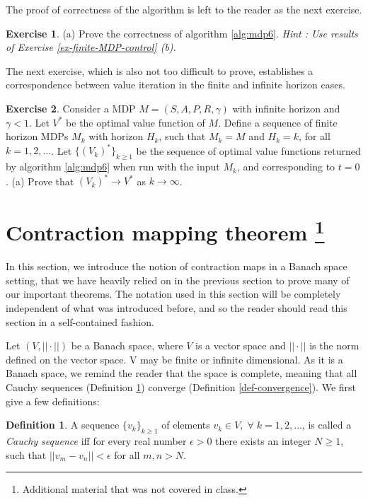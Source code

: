 \documentclass{article}
\theoremstyle{definition}
\newtheorem{exercise}{Exercise}[section]
\newtheorem{definition}{Definition}[section]
\theoremstyle{remark}
\begin{document}
The proof of correctness of the algorithm is left to the reader as the next exercise.
\begin{exercise}
(a) Prove the correctness of algorithm \ref{alg:mdp6}. \textit{Hint : Use results of Exercise \ref{ex-finite-MDP-control} (b).}
\label{ex-finite-value-iteration-convergence}
\end{exercise}

The next exercise, which is also not too difficult to prove, establishes a correspondence between value iteration in the finite and infinite horizon cases.

\begin{exercise}
Consider a MDP $M=(S,A,P,R,\gamma)$ with infinite horizon and $\gamma < 1$. Let $V^{\ast}$ be the optimal value function of $M$. Define a sequence of finite horizon MDPs  $M_k$ with horizon $H_k$, such that $M_k = M$ and $H_k = k$, for all $k=1,2,\dots$. Let $\{(V_k)^{\ast}\}_{k \geq 1}$ be the sequence of optimal value functions returned by algorithm \ref{alg:mdp6} when run with the input $M_k$, and corresponding to $t = 0$. (a) Prove that $(V_k)^{\ast} \rightarrow V^{\ast}$ as $k \rightarrow \infty$.
\label{ex-value-iteration-finite-infinite-correspondence}
\end{exercise}


\clearpage
\appendix
\appendixpage
\section{Contraction mapping theorem \footnote{Additional material that was not covered in class.} }
\label{contraction-map}
In this section, we introduce the notion of contraction maps in a Banach space setting, that we have heavily relied on in the previous section to prove many of our important theorems. The notation used in this section will be completely independent of what was introduced before, and so the reader should read this section in a self-contained fashion.

Let $(V,||\cdot||)$ be a Banach space, where $V$ is a vector space and $||\cdot||$ is the norm defined on the vector space. V may be finite or infinite dimensional. As it is a Banach space, we remind the reader that the space is complete, meaning that all Cauchy sequences (Definition \ref{def-cauchy-seq}) converge (Definition \ref{def-convergence}). We first give a few definitions:

\begin{definition}
A sequence $\{v_k\}_{k \geq 1}$ of elements $v_k \in V ,\;\forall\; k = 1,2,\dots$, is called a \textit{Cauchy sequence} iff for every real number $\epsilon > 0$ there exists an integer $N \geq 1$, such that $||v_m - v_n|| < \epsilon$ for all $m,n > N$.
\label{def-cauchy-seq}
\end{definition}
\end{document}
